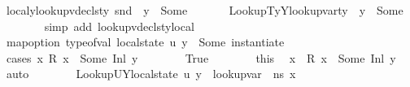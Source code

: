 \begin{isabellebody}
\ localy{\isacharcolon}{\kern0pt}{\isachardoublequoteopen}lookup{\isacharunderscore}{\kern0pt}vdecls{\isacharunderscore}{\kern0pt}ty\ {\isacharparenleft}{\kern0pt}snd\ {\isasymLambda}{\isacharprime}{\kern0pt}{\isacharparenright}{\kern0pt}\ y\ {\isacharequal}{\kern0pt}\ Some\ {\isasymtau}{\isachardoublequoteclose}\isanewline
\ \ \ \ \isamarkupfalse%
\ LookupTyY{\isacharcolon}{\kern0pt}{\isachardoublequoteopen}lookup{\isacharunderscore}{\kern0pt}var{\isacharunderscore}{\kern0pt}ty\ {\isasymLambda}{\isacharprime}{\kern0pt}\ y\ {\isacharequal}{\kern0pt}\ Some\ {\isasymtau}{\isachardoublequoteclose}\isanewline
\ \ \ \ \ \ \isamarkupfalse%
\ {\isacharparenleft}{\kern0pt}simp\ add{\isacharcolon}{\kern0pt}\ lookup{\isacharunderscore}{\kern0pt}vdecls{\isacharunderscore}{\kern0pt}ty{\isacharunderscore}{\kern0pt}local{\isacharunderscore}{\kern0pt}{}{\isacharparenright}{\kern0pt}\ \ \ \ \ \ \ \ \ \ \ \isanewline
\ \ \ \ \isamarkupfalse%
\ {\isachardoublequoteopen}map{\isacharunderscore}{\kern0pt}option\ type{\isacharunderscore}{\kern0pt}of{\isacharunderscore}{\kern0pt}val\ {\isacharparenleft}{\kern0pt}local{\isacharunderscore}{\kern0pt}state\ {\isacharquery}{\kern0pt}u\ y{\isacharparenright}{\kern0pt}\ {\isacharequal}{\kern0pt}\ Some\ {\isacharparenleft}{\kern0pt}instantiate\ {\isasymOmega}\ {\isasymtau}{\isacharparenright}{\kern0pt}{\isachardoublequoteclose}\isanewline
\ \ \ \ \isamarkupfalse%
\ {\isacharparenleft}{\kern0pt}cases\ {\isachardoublequoteopen}{\isasymexists}x{\isachardot}{\kern0pt}\ R\ x\ {\isacharequal}{\kern0pt}\ Some\ {\isacharparenleft}{\kern0pt}Inl\ y{\isacharparenright}{\kern0pt}{\isachardoublequoteclose}{\isacharparenright}{\kern0pt}\isanewline
\ \ \ \ \ \ \isamarkupfalse%
\ True\isanewline
\ \ \ \ \ \ \isamarkupfalse%
\ this\ \isamarkupfalse%
\ x\ \ {\isachardoublequoteopen}R\ x\ {\isacharequal}{\kern0pt}\ Some\ {\isacharparenleft}{\kern0pt}Inl\ y{\isacharparenright}{\kern0pt}{\isachardoublequoteclose}\ \isamarkupfalse%
\ auto\isanewline
\ \ \ \ \ \ \isamarkupfalse%
\ LookupUY{\isacharcolon}{\kern0pt}{\isachardoublequoteopen}local{\isacharunderscore}{\kern0pt}state\ {\isacharquery}{\kern0pt}u\ y\ {\isacharequal}{\kern0pt}\ lookup{\isacharunderscore}{\kern0pt}var\ {\isasymLambda}\ ns\ x{\isachardoublequoteclose}\isanewline
\ \ \ \ \ \ \ \ \isamarkupfalse%

\end{isabellebody}
